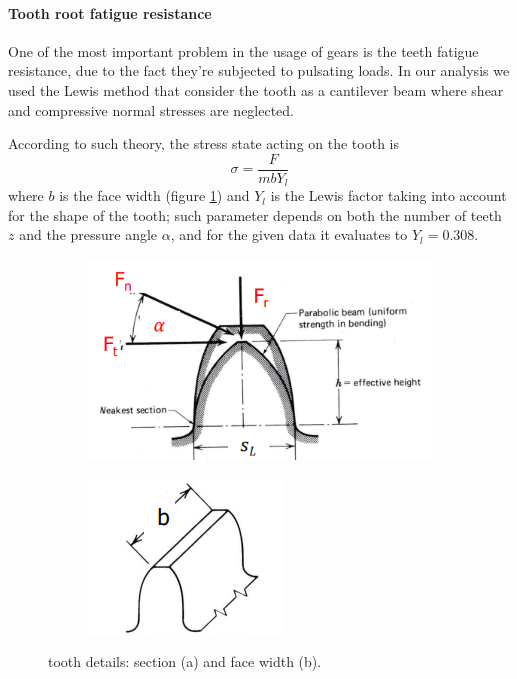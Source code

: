 	\paragraph{Tooth root fatigue resistance}	One of the most important problem in the usage of gears is the teeth fatigue resistance, due to the fact they're subjected to pulsating loads.  
	In our analysis we used the Lewis method that consider the tooth as a cantilever beam where shear and compressive normal stresses are neglected.
	
	According to such theory, the stress state acting on the tooth is
	\[ \sigma = \frac{F}{mb Y_l}\]
	where $b$ is the face width (figure \ref{fig:tooth}) and $Y_l$ is the Lewis factor taking into account for the shape of the tooth; such parameter depends on both the number of teeth $z$ and the pressure angle $\alpha$, and for the given data it evaluates to $Y_l = 0.308$.
	\begin{figure}[bt]
	\begin{subfigure}{.5\textwidth}
		\centering
		\includegraphics[scale=0.5]{Images/toothgear1.png}
		\caption{}
	\end{subfigure}%
	\begin{subfigure}{.5\textwidth}
		\centering
		\includegraphics[scale=0.6]{Images/toothgear2.png}
		\caption{}
	\end{subfigure}
	\caption{tooth details: section (a) and face width (b).}
	\label{fig:tooth}
	\end{figure}
	
